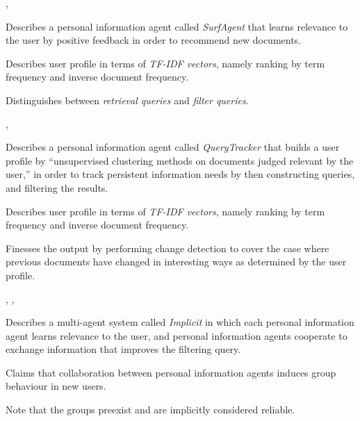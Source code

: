 %

\begin{albResearchNote}{%
    \citet{somlo03:_using_web_helper_agent_profil_query_gener}%
  }{%
    ,
  }
\item Describes a personal information agent called \emph{SurfAgent}
  that learns relevance to the user by positive feedback in order to
  recommend new documents.
\item Describes user profile in terms of \emph{TF-IDF vectors}, namely
  ranking by term frequency and inverse document frequency.
\item Distinguishes between \emph{retrieval queries} and \emph{filter
    queries}.
\end{albResearchNote}

%

\begin{albResearchNote}{%
    \citet{somlo04:_query}%
  }{%
    ,
  }
\item Describes a personal information agent called \emph{QueryTracker}
  that builds a user profile by ``unsupervised clustering methods on
  documents judged relevant by the user,'' in order to track persistent
  information needs by then constructing queries, and filtering the
  results.
\item Describes user profile in terms of \emph{TF-IDF vectors}, namely
  ranking by term frequency and inverse document frequency.
\item Finesses the output by performing change detection to cover the
  case where previous documents have changed in interesting ways as
  determined by the user profile.
\end{albResearchNote}

%

\begin{albResearchNote}{%
    \citet{birukov05:_implic}%
  }{%
    ,
    ,
  }
\item Describes a multi-agent system called \emph{Implicit} in which
  each personal information agent learns relevance to the user, and
  personal information agents cooperate to exchange information that
  improves the filtering query.
\item Claims that collaboration between personal information agents
  induces group behaviour in new users.
\item Note that the groups preexist and are implicitly considered
  reliable.
\end{albResearchNote}

